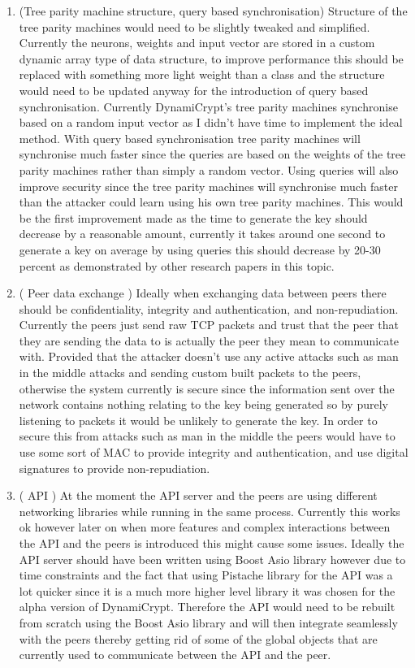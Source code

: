 \begin{enumerate}
	\item (Tree parity machine structure, query based synchronisation) Structure of the tree parity machines would need to be slightly tweaked and simplified. Currently the neurons, weights and input vector are stored in a custom dynamic array type of data structure, to improve performance this should be replaced with something more light weight than a class and the structure would need to be updated anyway for the introduction of query based synchronisation. Currently DynamiCrypt's tree parity machines synchronise based on a random input vector as I didn't have time to implement the ideal method. With query based synchronisation tree parity machines will synchronise much faster since the queries are based on the weights of the tree parity machines rather than simply a random vector. Using queries will also improve security since the tree parity machines will synchronise much faster than the attacker could learn using his own tree parity machines. This would be the first improvement made as the time to generate the key should decrease by a reasonable amount, currently it takes around one second to generate a key on average by using queries this should decrease by 20-30 percent as demonstrated by other research papers in this topic.
	\item ( Peer data exchange ) Ideally when exchanging data between peers there should be confidentiality, integrity and authentication, and non-repudiation. Currently the peers just send raw TCP packets and trust that the peer that they are sending the data to is actually the peer they mean to communicate with. Provided that the attacker doesn't use any active attacks such as man in the middle attacks and sending custom built packets to the peers, otherwise the system currently is secure since the information sent over the network contains nothing relating to the key being generated so by purely listening to packets it would be unlikely to generate the key. In order to secure this from attacks such as man in the middle the peers would have to use some sort of MAC to provide integrity and authentication, and use digital signatures to provide non-repudiation.
	\item ( API ) At the moment the API server and the peers are using different networking libraries while running in the same process. Currently this works ok however later on when more features and complex interactions between the API and the peers is introduced this might cause some issues. Ideally the API server should have been written using Boost Asio library however due to time constraints and the fact that using Pistache library for the API was a lot quicker since it is a much more higher level library it was chosen for the alpha version of DynamiCrypt. Therefore the API would need to be rebuilt from scratch using the Boost Asio library and will then integrate seamlessly with the peers thereby getting rid of some of the global objects that are currently used to communicate between the API and the peer.

\end{enumerate}
